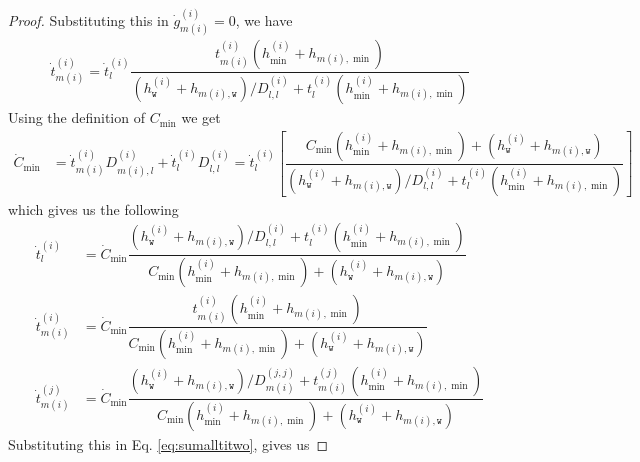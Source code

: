 \documentclass{article}
\begin{document}
\begin{proof}
  Substituting this in $\dot{g}^{(i)}_{m(i)}=0$, we have
  \begin{align*}
      \dot{t}^{(i)}_{m(i)} = \dot{t}^{(i)}_l \dfrac{ t^{(i)}_{m(i)}(h^{(i)}_{\min}+h_{m(i),\min})}{(h^{(i)}_{\texttt{w}}+h_{m(i),\texttt{w}})/D^{(i)}_{l,l}+t^{(i)}_l(h^{(i)}_{\min}+h_{m(i),\min})}
  \end{align*}
  Using the definition of $C_{\min}$ we get
  \begin{align*}
      \dot{C}_{\min} &= \dot{t}^{(i)}_{m(i)}D^{(i)}_{m(i),l}+\dot{t}^{(i)}_{l} D^{(i)}_{l,l}= \dot{t}^{(i)}_{l}[ \dfrac{ C_{\min}(h^{(i)}_{\min}+h_{m(i),\min})+(h^{(i)}_{\texttt{w}}+h_{m(i),\texttt{w}})}{(h^{(i)}_{\texttt{w}}+h_{m(i),\texttt{w}})/D^{(i)}_{l,l}+t^{(i)}_l(h^{(i)}_{\min}+h_{m(i),\min})}]
   \end{align*}
   which gives us the following
   \begin{align*}
       \dot{t}^{(i)}_{l} &= \dot{C}_{\min}\dfrac{(h^{(i)}_{\texttt{w}}+h_{m(i),\texttt{w}})/D^{(i)}_{l,l}+t^{(i)}_l(h^{(i)}_{\min}+h_{m(i),\min})}{ C_{\min}(h^{(i)}_{\min}+h_{m(i),\min})+(h^{(i)}_{\texttt{w}}+h_{m(i),\texttt{w}})}\\
       \dot{t}^{(i)}_{m(i)} &= \dot{C}_{\min}\dfrac{ t^{(i)}_{m(i)}(h^{(i)}_{\min}+h_{m(i),\min})}{ C_{\min}(h^{(i)}_{\min}+h_{m(i),\min})+(h^{(i)}_{\texttt{w}}+h_{m(i),\texttt{w}})}\\
       \dot{t}^{(j)}_{m(i)} &=   \dot{C}_{\min}\dfrac{(h^{(i)}_{\texttt{w}}+h_{m(i),\texttt{w}})/D^{(j,j)}_{m(i)}+t^{(j)}_{m(i)}(h^{(i)}_{\min}+h_{m(i),\min})}{ C_{\min}(h^{(i)}_{\min}+h_{m(i),\min})+(h^{(i)}_{\texttt{w}}+h_{m(i),\texttt{w}})}
   \end{align*}
   Substituting this in Eq. \ref{eq:sumalltitwo}, gives us 


\end{proof}
\end{document}
